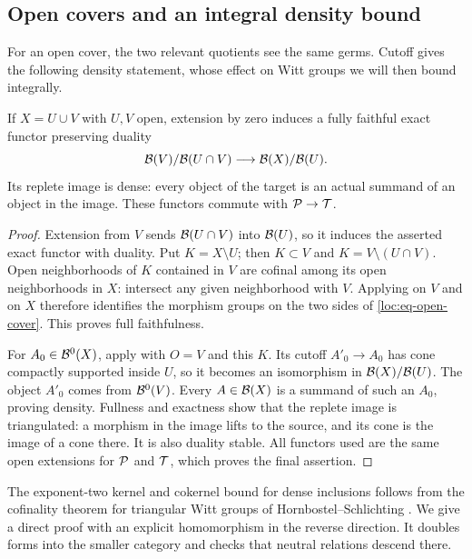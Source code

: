 \subsection{Open covers and an integral density bound}

For an open cover, the two relevant quotients see the same germs.
Cutoff gives the following density statement, whose effect on Witt
groups we will then bound integrally.

\begin{proposition}
\label{prop:open-cover}
If $X=U\cup V$ with $U,V$ open, extension by zero induces a fully
faithful exact functor preserving duality
\begin{equation}
\label{loc:eq-open-cover}
 \mathcal B(V)/\mathcal B(U\cap V)
 \longrightarrow\mathcal B(X)/\mathcal B(U).
\end{equation}
Its replete image is dense: every object of the target is an actual
summand of an object in the image.  These functors commute with
$\mathcal P\to\mathcal T$.
\end{proposition}

\begin{proof}
Extension from $V$ sends $\mathcal B(U\cap V)$ into $\mathcal B(U)$, so it
induces the asserted exact functor with duality.  Put $K=X\setminus U$;
then $K\subset V$ and $K=V\setminus(U\cap V)$.  Open neighborhoods
of $K$ contained in $V$ are cofinal among its open neighborhoods in
$X$: intersect any given neighborhood with $V$.  Applying
 on $V$ and on $X$ therefore identifies the morphism
groups on the two sides of \eqref{loc:eq-open-cover}.  This proves
full faithfulness.

For $A_0\in\mathcal B^0(X)$, apply  with $O=V$ and this
$K$.  Its cutoff $A'_0\to A_0$ has cone compactly supported inside
$U$, so it becomes an isomorphism in $\mathcal B(X)/\mathcal B(U)$.  The object
$A'_0$ comes from $\mathcal B^0(V)$.  Every $A\in\mathcal B(X)$ is a summand
of such an $A_0$, proving density.  Fullness and exactness show that
the replete image is triangulated: a morphism in the image lifts to
the source, and its cone is the image of a cone there.  It is also
duality stable.  All functors used are the same open extensions for
$\mathcal P$ and $\mathcal T$, which proves the final assertion.
\end{proof}

The exponent-two kernel and cokernel bound for dense inclusions follows
from the cofinality theorem for triangular Witt groups of
Hornbostel--Schlichting
\cite[author preprint, Appendix~A, Theorem~A.2]{HornbostelSchlichting2004}.
We give a direct proof with an explicit homomorphism in the reverse
direction.  It doubles forms into the smaller category and checks that
neutral relations descend there.

